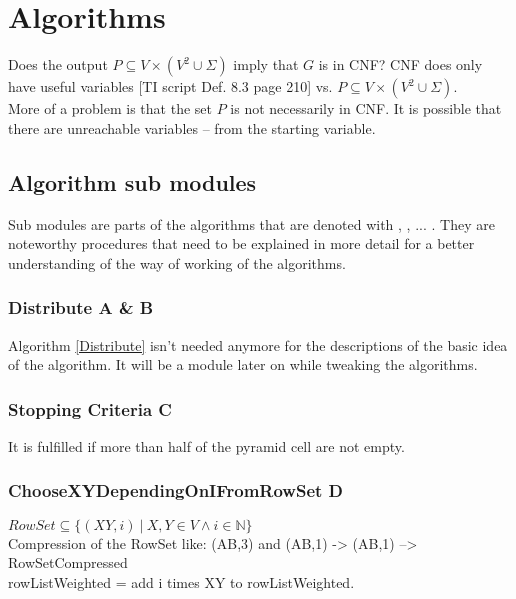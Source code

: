 
\section{Algorithms}\label{algorithms}

\noindent Does the output $P \subseteq V \times (V^{2} \cup \Sigma)$ imply that $G$ is in CNF? CNF does only have useful variables [TI script Def. 8.3 page 210] vs. $P \subseteq V \times (V^{2} \cup \Sigma)$.\\
\noindent More of a problem is that the set $P$ is not necessarily in CNF. It is possible that there are unreachable variables -- from the starting variable.

\subsection{Algorithm sub modules}
Sub modules are parts of the algorithms that are denoted with , , ... . They are noteworthy procedures that need to be explained in more detail for a better understanding of the way of working of the algorithms.
\subsubsection{Distribute A \& B}
\noindent
{}
Algorithm \ref{Distribute} isn't needed anymore for the descriptions of the basic idea of the algorithm. It will be a module later on while tweaking the algorithms.

\subsubsection{Stopping Criteria C}
It is fulfilled if more than half of the pyramid cell are not empty.

\subsubsection{ChooseXYDependingOnIFromRowSet D}
$RowSet \subseteq \{(XY,i)\ |\ X,Y \in V \wedge i \in \mathbb{N} \}$\\
Compression of the RowSet like: (AB,3) and (AB,1) -> (AB,1) --> RowSetCompressed\\
rowListWeighted = add i times XY to rowListWeighted.

